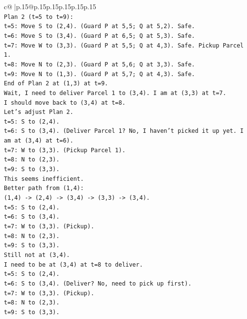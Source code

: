 \documentclass{article}
\begin{document}
{\begin{supertabular}{c@{$\;$}|p{.15\linewidth}@{}p{.15\linewidth}p{.15\linewidth}p{.15\linewidth}p{.15\linewidth}p{.15\linewidth}}
{{{\\ 
\texttt{Plan 2 (t=5 to t=9):} \\
\texttt{t=5: Move S to (2,4). (Guard P at 5,5; Q at 5,2). Safe.} \\
\texttt{t=6: Move S to (3,4). (Guard P at 6,5; Q at 5,3). Safe.} \\
\texttt{t=7: Move W to (3,3). (Guard P at 5,5; Q at 4,3). Safe. Pickup Parcel 1.} \\
\texttt{t=8: Move N to (2,3). (Guard P at 5,6; Q at 3,3). Safe.} \\
\texttt{t=9: Move N to (1,3). (Guard P at 5,7; Q at 4,3). Safe.} \\
\texttt{End of Plan 2 at (1,3) at t=9.} \\
\texttt{Wait, I need to deliver Parcel 1 to (3,4). I am at (3,3) at t=7.} \\
\texttt{I should move back to (3,4) at t=8.} \\
\texttt{Let's adjust Plan 2.} \\
\texttt{t=5: S to (2,4).} \\
\texttt{t=6: S to (3,4). (Deliver Parcel 1? No, I haven't picked it up yet. I am at (3,4) at t=6).} \\
\texttt{t=7: W to (3,3). (Pickup Parcel 1).} \\
\texttt{t=8: N to (2,3).} \\
\texttt{t=9: S to (3,3).} \\
\texttt{This seems inefficient.} \\
\texttt{Better path from (1,4):} \\
\texttt{(1,4) {-}> (2,4) {-}> (3,4) {-}> (3,3) {-}> (3,4).} \\
\texttt{t=5: S to (2,4).} \\
\texttt{t=6: S to (3,4).} \\
\texttt{t=7: W to (3,3). (Pickup).} \\
\texttt{t=8: N to (2,3).} \\
\texttt{t=9: S to (3,3).} \\
\texttt{Still not at (3,4).} \\
\texttt{I need to be at (3,4) at t=8 to deliver.} \\
\texttt{t=5: S to (2,4).} \\
\texttt{t=6: S to (3,4). (Deliver? No, need to pick up first).} \\
\texttt{t=7: W to (3,3). (Pickup).} \\
\texttt{t=8: N to (2,3).} \\
\texttt{t=9: S to (3,3).} \\
}}}
\end{supertabular}}
\end{document}
